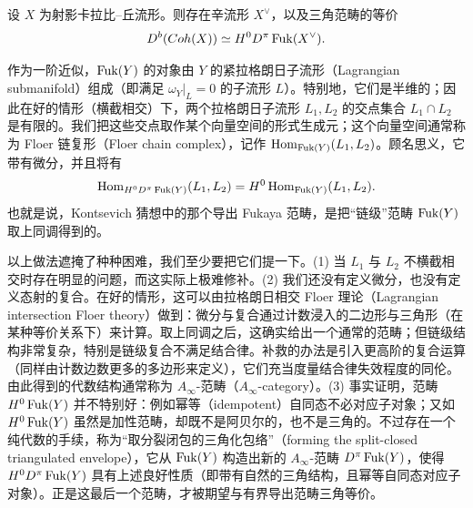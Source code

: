 \begin{conjecture*}[Kontsevich]
设 $X$ 为射影卡拉比–丘流形。则存在辛流形 $X^\vee$，以及三角范畴的等价
\[
  D^b(Coh(X)) \simeq H^0D^\pi\operatorname{Fuk}(X^\vee).
\]
\end{conjecture*}



作为一阶近似，$\operatorname{Fuk}(Y)$ 的对象由 $Y$ 的紧拉格朗日子流形（Lagrangian submanifold）组成（即满足 $\omega_Y|_L=0$ 的子流形 $L$）。特别地，它们是半维的；因此在好的情形（横截相交）下，两个拉格朗日子流形 $L_1,L_2$ 的交点集合 $L_1\cap L_2$ 是有限的。我们把这些交点取作某个向量空间的形式生成元；这个向量空间通常称为 Floer 链复形（Floer chain complex），记作 $\operatorname{Hom}_{\operatorname{Fuk}(Y)}(L_1,L_2)$。顾名思义，它带有微分，并且将有
\[
  \operatorname{Hom}_{H^0D^\pi\operatorname{Fuk}(Y)}(L_1,L_2) = H^0\operatorname{Hom}_{\operatorname{Fuk}(Y)}(L_1,L_2).
\]
也就是说，Kontsevich 猜想中的那个导出 Fukaya 范畴，是把“链级”范畴 $\operatorname{Fuk}(Y)$ 取上同调得到的。


以上做法遮掩了种种困难，我们至少要把它们提一下。(1) 当 $L_1$ 与 $L_2$ 不横截相交时存在明显的问题，而这实际上极难修补。(2) 我们还没有定义微分，也没有定义态射的复合。在好的情形，这可以由拉格朗日相交 Floer 理论（Lagrangian intersection Floer theory）做到：微分与复合通过计数浸入的二边形与三角形（在某种等价关系下）来计算。取上同调之后，这确实给出一个通常的范畴；但链级结构非常复杂，特别是链级复合不满足结合律。补救的办法是引入更高阶的复合运算（同样由计数边数更多的多边形来定义），它们充当度量结合律失效程度的同伦。由此得到的代数结构通常称为 $A_\infty$-范畴（$A_\infty$-category）。(3) 事实证明，范畴 $H^0\operatorname{Fuk}(Y)$ 并不特别好：例如幂等（idempotent）自同态不必对应子对象；又如 $H^0\operatorname{Fuk}(Y)$ 虽然是加性范畴，却既不是阿贝尔的，也不是三角的。不过存在一个纯代数的手续，称为“取分裂闭包的三角化包络”（forming the split-closed triangulated envelope），它从 $\operatorname{Fuk}(Y)$ 构造出新的 $A_\infty$-范畴 $D^\pi\operatorname{Fuk}(Y)$，使得 $H^0D^\pi\operatorname{Fuk}(Y)$ 具有上述良好性质（即带有自然的三角结构，且幂等自同态对应子对象）。正是这最后一个范畴，才被期望与有界导出范畴三角等价。

